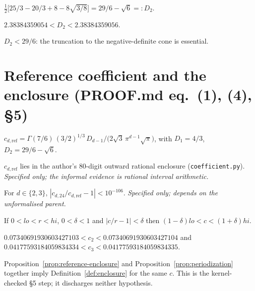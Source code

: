 \begin{lemma}\label{lem:d2-algebra}\leanok{}
$\tfrac12\bigl[25/3-20/3+8-8\sqrt{3/8}\bigr]=29/6-\sqrt6 =: D_2$.
\end{lemma}

\begin{lemma}\label{lem:d2-bounds}\leanok
$2.38384359054<D_2<2.38384359056$.
\end{lemma}

\begin{lemma}\label{lem:truncation}\leanok
$D_2<29/6$: the truncation to the negative-definite cone is essential.
\end{lemma}

\chapter{Reference coefficient and the enclosure (PROOF.md eq.~(1), (4), \S5)}

\begin{definition}\label{def:reference}
$c_{d,\mathrm{ref}}=\Gamma(7/6)\,(3/2)^{1/3}\,D_{d-1}\big/\bigl(2\sqrt3\,\pi^{d-1}\sqrt\pi\bigr)$, with $D_1=4/3$, $D_2=29/6-\sqrt6$.
\end{definition}

\begin{proposition}\label{prop:reference-enclosure}
$c_{d,\mathrm{ref}}$ lies in the author's 80-digit outward rational enclosure (\texttt{coefficient.py}).
\emph{Specified only; the informal evidence is rational interval arithmetic.}
\end{proposition}

\begin{proposition}\label{prop:periodization}
For $d\in\{2,3\}$, $|c_{d,24}/c_{d,\mathrm{ref}}-1|<10^{-106}$.
\emph{Specified only; depends on the unformalised parent.}
\end{proposition}

\begin{lemma}\label{lem:perturbed}\leanok
If $0<lo<r<hi$, $0<\delta<1$ and $|c/r-1|<\delta$ then $(1-\delta)lo<c<(1+\delta)hi$.
\end{lemma}

\begin{definition}\label{def:enclosure}
$0.07340691930603427103<c_2<0.07340691930603427104$ and $0.04177593184059834334<c_3<0.04177593184059834335$.
\end{definition}

\begin{theorem}\label{thm:enclosure-of-reference}\leanok
{}
Proposition~\ref{prop:reference-enclosure} and Proposition~\ref{prop:periodization} together imply
Definition~\ref{def:enclosure} for the same $c$.
This is the kernel-checked \S5 step; it discharges neither hypothesis.
\end{theorem}
